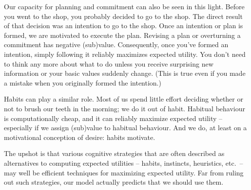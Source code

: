 Our capacity for planning and commitment can also be seen in this
light. Before you went to the shop, you probably decided to go to the
shop. The direct result of that decision was an intention to go to the
shop.%
%
%
Once an intention or plan is formed, we are motivated to execute the
plan. Revising a plan or overturning a commitment has negative
(sub)value. Consequently, once you've formed an intention, simply
following it reliably maximizes expected utility. You don't need to
think any more about what to do unless you receive surprising new
information or your basic values suddenly change. (This is true even if
you made a mistake when you originally formed the intention.)

Habits can play a similar role. Most of us spend little effort
deciding whether or not to brush our teeth in the morning; we do it
out of habit. Habitual behaviour is computationally cheap, and it can
reliably maximize expected utility -- especially if we assign
(sub)value to habitual behaviour. And we do, at least on a
motivational conception of desire: habits motivate.

The upshot is that various cognitive strategies that are often
described as alternatives to computing expected utilities -- habits,
instincts, heuristics, etc.\ -- may well be efficient
techniques for maximizing expected utility. Far from ruling out such
strategies, our model actually predicts that we should use them.


